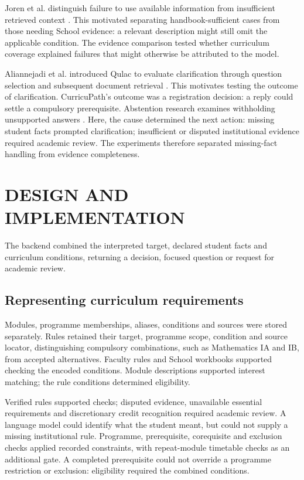 Joren et al. distinguish failure to use available information from insufficient retrieved context \cite{joren}. This motivated separating handbook-sufficient cases from those needing School evidence: a relevant description might still omit the applicable condition. The evidence comparison tested whether curriculum coverage explained failures that might otherwise be attributed to the model.

Aliannejadi et al. introduced Qulac to evaluate clarification through question selection and subsequent document retrieval \cite{qulac}. This motivates testing the outcome of clarification. CurricuPath's outcome was a registration decision: a reply could settle a compulsory prerequisite. Abstention research examines withholding unsupported answers \cite{abstention}. Here, the cause determined the next action: missing student facts prompted clarification; insufficient or disputed institutional evidence required academic review. The experiments therefore separated missing-fact handling from evidence completeness.

\section{DESIGN AND IMPLEMENTATION}
The backend combined the interpreted target, declared student facts and curriculum conditions, returning a decision, focused question or request for academic review.

\subsection{Representing curriculum requirements}
Modules, programme memberships, aliases, conditions and sources were stored separately. Rules retained their target, programme scope, condition and source locator, distinguishing compulsory combinations, such as Mathematics IA and IB, from accepted alternatives. Faculty rules \cite{wits} and School workbooks supported checking the encoded conditions. Module descriptions supported interest matching; the rule conditions determined eligibility.

Verified rules supported checks; disputed evidence, unavailable essential requirements and discretionary credit recognition required academic review. A language model could identify what the student meant, but could not supply a missing institutional rule. Programme, prerequisite, corequisite and exclusion checks applied recorded constraints, with repeat-module timetable checks as an additional gate. A completed prerequisite could not override a programme restriction or exclusion: eligibility required the combined conditions.

